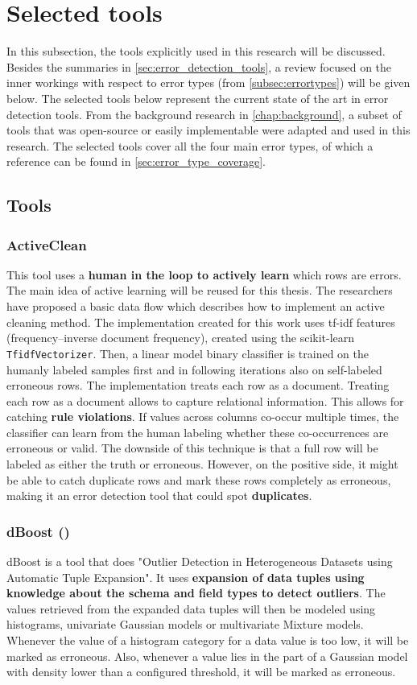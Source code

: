 \chapter{Selected tools}
\label{chap:selectedtools}
In this subsection, the tools explicitly used in this research will be discussed. Besides the summaries in \autoref{sec:error_detection_tools}, a review focused on the inner workings with respect to error types (from \autoref{subsec:errortypes}) will be given below. 
The selected tools below represent the current state of the art in error detection tools. From the background research in \autoref{chap:background}, a subset of tools that was open-source or easily implementable were adapted and used in this research. The selected tools cover all the four main error types, of which a reference can be found in \autoref{sec:error_type_coverage}.

\section{Tools}
\subsection{ActiveClean \cite{Krishnan2016-rg}}
This tool uses a \textbf{human in the loop to actively learn} which rows are errors. 
The main idea of active learning will be reused for this thesis. The researchers have proposed a basic data flow which describes how to implement an active cleaning method. 
The implementation created for this work uses tf-idf features (frequency–inverse document frequency), created using the scikit-learn \verb|TfidfVectorizer|. Then, a linear model binary classifier is trained on the humanly labeled samples first and in following iterations also on self-labeled erroneous rows. The implementation treats each row as a document. 
Treating each row as a document allows to capture relational information. This allows for catching \textbf{rule violations}. If values across columns co-occur multiple times, the classifier can learn from the human labeling whether these co-occurrences are erroneous or valid. The downside of this technique is that a full row will be labeled as either the truth or erroneous. However, on the positive side, it might be able to catch duplicate rows and mark these rows completely as erroneous, making it an error detection tool that could spot \textbf{duplicates}.

\subsection{dBoost (\cite{Pit--Claudel2016-dj})}
dBoost is a tool that does "Outlier Detection in Heterogeneous Datasets using Automatic Tuple Expansion". It uses \textbf{expansion of data tuples using knowledge about the schema and field types to detect outliers}.
The values retrieved from the expanded data tuples will then be modeled using histograms, univariate Gaussian models or multivariate Mixture models. Whenever the value of a histogram category for a data value is too low, it will be marked as erroneous. Also, whenever a value lies in the part of a Gaussian model with density lower than a configured threshold, it will be marked as erroneous. 

